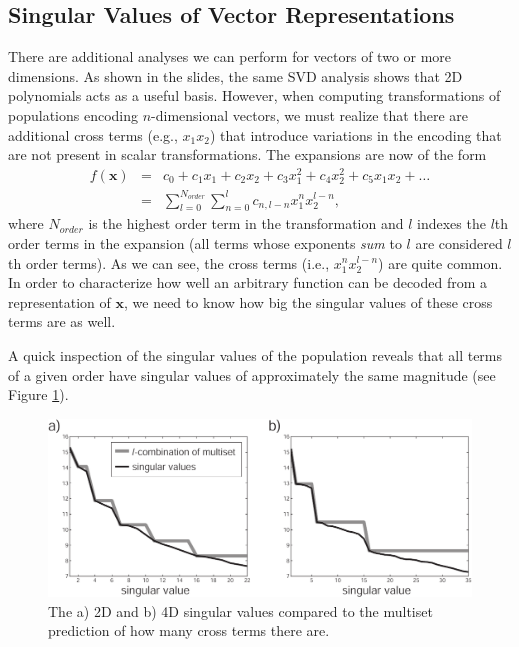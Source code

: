 \documentclass[10pt,letterpaper,oneside]{article}
\begin{document}
\subsection{Singular Values of Vector Representations}

There are additional analyses we can perform for vectors
of two or more dimensions. As shown in the slides, the same SVD analysis shows that 2D polynomials acts as a useful basis. However, when computing transformations of populations encoding $n$-dimensional
vectors, we must realize that there are additional cross terms (e.g.,
$x_{1}x_{2}$) that introduce variations in the encoding that are
not present in scalar transformations. The expansions are now of the
form
\begin{eqnarray*}
f(\mathbf{x}) & = & c_{0}+c_{1}x_{1}+c_{2}x_{2}+c_{3}x_{1}^{2}+c_{4}x_{2}^{2}+c_{5}x_{1}x_{2}+\ldots\\
 & = & \sum_{l=0}^{N_{order}}\sum_{n=0}^{l}c_{n,l-n}x_{1}^{n}x_{2}^{l-n},
\end{eqnarray*}
 where $N_{order}$ is the highest order term in the transformation
and $l$ indexes the $l$th order terms in the expansion (all terms
whose exponents \emph{sum} to $l$ are considered $l$th order terms).
As we can see, the cross terms (i.e., $x_{1}^{n}x_{2}^{l-n}$) are
quite common. In order to characterize how well an arbitrary function
can be decoded from a representation of $\mathbf{x}$, we need to
know how big the singular values of these cross terms are as well.

A quick inspection of the singular values of the population reveals
that all terms of a given order have singular values of approximately
the same magnitude (see Figure \ref{2d.singular.values}).

\begin{figure}[t]
  \centering
  \includegraphics{media/c5.multiset.2D.pdf}
  \caption{The a) 2D and b) 4D singular values compared to the multiset prediction of how many cross terms there are.}
	\label{2d.singular.values}
\end{figure}
\end{document}
